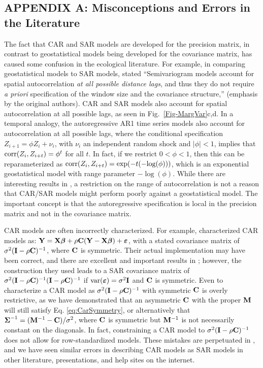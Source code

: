\documentclass[11pt, titlepage]{article}\usepackage[]{graphicx}\usepackage[]{color}
\begin{document}
\begin{spacing}{1.9}
\begin{flushleft}
\clearpage
\setcounter{equation}{0}
\renewcommand{\theequation}{A.\arabic{equation}}
\setcounter{figure}{0}
\renewcommand{\thefigure}{A.\arabic{figure}}
\section{APPENDIX A: Misconceptions and Errors in the Literature}

The fact that CAR and SAR models are developed for the precision matrix, in contrast to geostatistical models being developed for the covariance matrix, has caused some confusion in the ecological literature.  For example, in comparing geostatistical models to SAR models, \citet{Begu:Puey:comp:2009} stated ``Semivariogram models account for spatial autocorrelation \emph{at all possible distance lags}, and thus they do not require \emph{a priori} specification of the window size and the covariance structure,'' (emphasis by the original authors).  CAR and SAR models also account for spatial autocorrelation at all possible lags, as seen in Fig.~\ref{Fig-MargVar}c,d.  In a temporal analogy, the autoregressive AR1 time series models also account for autocorrelation at all possible lags, where the conditional specification $Z_{i+1} = \phi Z_i + \nu_i$, with $\nu_i$ an independent random shock and $|\phi| < 1$, implies that $\textrm{corr}(Z_{i},Z_{i+t}) = \phi^t$ for all $t$.  In fact, if we restrict $0 < \phi < 1$, then this can be reparameterized as $\textrm{corr}(Z_{i},Z_{i+t}) = \exp(-t(-\textrm{log}(\phi)))$, which is an exponential geostatistical model with range parameter $-\log(\phi)$.  While there are interesting results in \citet{Begu:Puey:comp:2009}, a restriction on the range of autocorrelation is not a reason that CAR/SAR models might perform poorly against a geostatistical model.  The important concept is that the autoregressive specification is local in the precision matrix and not in the covariance matrix.

CAR models are often incorrectly characterized.  For example, \citet{Keit:Bjor:Dixo:Citr:acco:2002} characterized CAR models as: $\mathbf{Y} = \mathbf{X}\mbox{\boldmath $\beta$} + \rho\mathbf{C}(\mathbf{Y} - \mathbf{X}\mbox{\boldmath $\beta$}) + \mbox{\boldmath $\varepsilon$}$, with a stated covariance matrix of $\sigma^2(\mathbf{I} - \rho\mathbf{C})^{-1}$, where $\mathbf{C}$ is symmetric. Their actual implementation may have been correct, and there are excellent and important results in \citet{Keit:Bjor:Dixo:Citr:acco:2002}; however, the construction they used leads to a SAR covariance matrix of $\sigma^2(\mathbf{I} - \rho\mathbf{C})^{-1}(\mathbf{I} - \rho\mathbf{C})^{-1}$ if $\textrm{var}(\mbox{\boldmath $\varepsilon$}) = \sigma^2\mathbf{I}$ and $\mathbf{C}$ is symmetric. Even to characterize a CAR model as $\sigma^2(\mathbf{I} - \rho\mathbf{C})^{-1}$ with symmetric $\mathbf{C}$ is overly restrictive, as we have demonstrated that an asymmetric $\mathbf{C}$ with the proper $\mathbf{M}$ will still satisfy Eq. \ref{eq:CarSymmetry}, or alternatively that $\mbox{\boldmath $\Sigma$}^{-1} = (\mathbf{M}^{-1} - \mathbf{C})/\sigma^2$, where $\mathbf{C}$ is symmetric but $\mathbf{M}^{-1}$ is not necessarily constant on the diagonals. In fact, constraining a CAR model to $\sigma^2(\mathbf{I} - \rho\mathbf{C})^{-1}$ does not allow for row-standardized models.  These mistakes are perpetuated in \citet{Dorm:etal:meth:2007}, and we have seen similar errors in describing CAR models as SAR models in other literature, presentations, and help sites on the internet. 


\end{flushleft}
\end{spacing}
\end{document}
